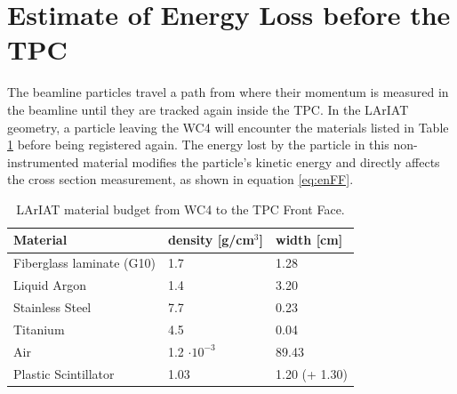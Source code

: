 \section{Estimate of Energy Loss before the TPC}\label{ch:eloss}
The beamline particles travel a path from where their  momentum is measured in the beamline until they are tracked again inside the TPC. In the LArIAT geometry, a particle leaving the WC4 will encounter the materials listed in Table \ref{tab:budget} before being registered again. The energy lost by the particle in this non-instrumented material modifies the particle's kinetic energy and directly affects the cross section measurement, as shown in equation \ref{eq:enFF}.

\begin{table}[h!]
\centering
\begin{tabular}{|l|l|l|}
\hline
Material  & density {[}g/cm$^3${]} & width {[}cm{]}    \\ \hline
Fiberglass laminate (G10)      & 1.7                             & 1.28                              \\
Liquid Argon                           & 1.4                             & 3.20                             \\
Stainless Steel                        & 7.7                            & 0.23                             \\
Titanium                                  & 4.5                            & 0.04                             \\ 
Air                                            &  1.2 $\cdot10^{-3}$  & 89.43                              \\
Plastic Scintillator                    & 1.03                          & 1.20 (+ 1.30)                 \\ \hline
\end{tabular}
\caption{LArIAT material budget from WC4 to the TPC Front Face.}
\label{tab:budget}
\end{table}


